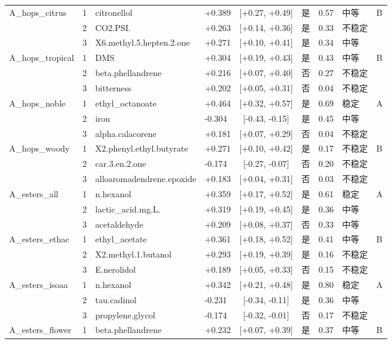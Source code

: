 {\begin{longtable}{llllcccll}
A\_hops\_citrus & 1 & citronellol & +0.389 & [+0.27, +0.49] & 是 & 0.57 & 中等 & B \\
 & 2 & CO2.PSI. & +0.263 & [+0.14, +0.36] & 是 & 0.33 & 不稳定 &  \\
 & 3 & X6.methyl.5.hepten.2.one & +0.271 & [+0.10, +0.41] & 是 & 0.34 & 中等 &  \\
A\_hops\_tropical & 1 & DMS & +0.304 & [+0.19, +0.43] & 是 & 0.43 & 中等 & B \\
 & 2 & beta.phellandrene & +0.216 & [+0.07, +0.40] & 否 & 0.27 & 不稳定 &  \\
 & 3 & bitterness & +0.202 & [+0.05, +0.31] & 否 & 0.04 & 不稳定 &  \\
A\_hops\_noble & 1 & ethyl\_octanoate & +0.464 & [+0.32, +0.57] & 是 & 0.69 & 稳定 & A \\
 & 2 & iron & -0.304 & [-0.43, -0.15] & 是 & 0.45 & 中等 &  \\
 & 3 & alpha.calacorene & +0.181 & [+0.07, +0.29] & 否 & 0.04 & 不稳定 &  \\
A\_hops\_woody & 1 & X2.phenyl.ethyl.butyrate & +0.271 & [+0.10, +0.42] & 是 & 0.17 & 不稳定 & B \\
 & 2 & car.3.en.2.one & -0.174 & [-0.27, -0.07] & 否 & 0.20 & 不稳定 &  \\
 & 3 & alloaromadendrene.epoxide & +0.183 & [+0.04, +0.31] & 否 & 0.03 & 不稳定 &  \\
A\_esters\_all & 1 & n.hexanol & +0.359 & [+0.17, +0.52] & 是 & 0.61 & 稳定 & A \\
 & 2 & lactic\_acid.mg.L. & +0.319 & [+0.19, +0.45] & 是 & 0.36 & 中等 &  \\
 & 3 & acetaldehyde & +0.209 & [+0.08, +0.37] & 否 & 0.33 & 中等 &  \\
A\_esters\_ethac & 1 & ethyl\_acetate & +0.361 & [+0.18, +0.52] & 是 & 0.41 & 中等 & B \\
 & 2 & X2.methyl.1.butanol & +0.293 & [+0.19, +0.39] & 是 & 0.16 & 不稳定 &  \\
 & 3 & E.nerolidol & +0.189 & [+0.05, +0.33] & 否 & 0.15 & 不稳定 &  \\
A\_esters\_isoaa & 1 & n.hexanol & +0.342 & [+0.21, +0.48] & 是 & 0.80 & 稳定 & A \\
 & 2 & tau.cadinol & -0.231 & [-0.34, -0.11] & 是 & 0.36 & 中等 &  \\
 & 3 & propylene.glycol & -0.174 & [-0.32, -0.01] & 否 & 0.17 & 不稳定 &  \\
A\_esters\_flower & 1 & beta.phellandrene & +0.232 & [+0.07, +0.39] & 是 & 0.37 & 中等 & B \\

\end{longtable}}
